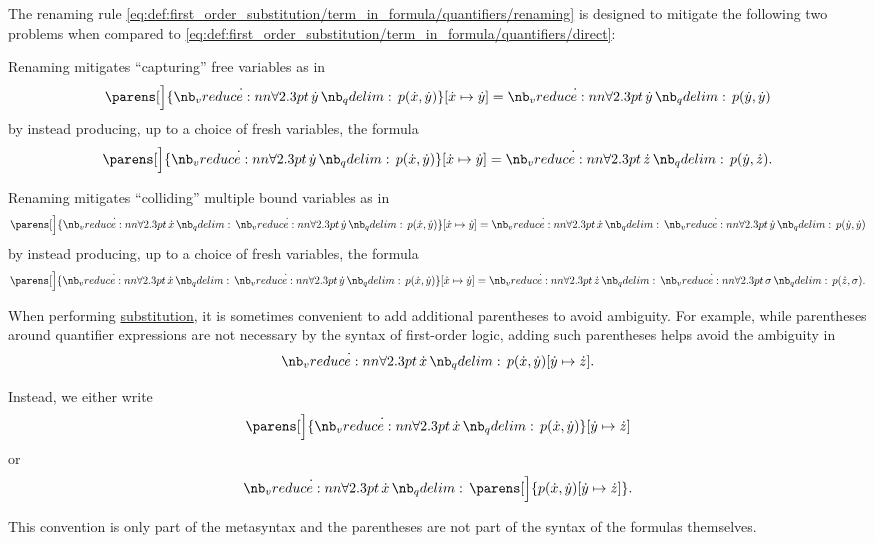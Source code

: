 \begin{remark}\label{rem:first_order_substitution_renaming_justification}
  The renaming rule \eqref{eq:def:first_order_substitution/term_in_formula/quantifiers/renaming} is designed to mitigate the following two problems when compared to \eqref{eq:def:first_order_substitution/term_in_formula/quantifiers/direct}:

  \begin{thmenum}
     Renaming mitigates \enquote{capturing} free variables as in
    \begin{equation*}
      \parens[\Big]{ \qforall \syny p(\synx, \syny) }[\synx \mapsto \syny] = \qforall \syny p(\syny, \syny)
    \end{equation*}
    by instead producing, up to a choice of fresh variables, the formula
    \begin{equation*}
      \parens[\Big]{ \qforall \syny p(\synx, \syny) }[\synx \mapsto \syny] = \qforall \synz p(\syny, \synz).
    \end{equation*}

     Renaming mitigates \enquote{colliding} multiple bound variables as in
    \begin{equation*}
      \parens[\Big]{ \qforall \synx \qforall \syny p(\synx, \syny) }[\synx \mapsto \syny] = \qforall \synx \qforall \syny p(\syny, \syny)
    \end{equation*}
    by instead producing, up to a choice of fresh variables, the formula
    \begin{equation*}
      \parens[\Big]{ \qforall \synx \qforall \syny p(\synx, \syny) }[\synx \mapsto \syny] = \qforall \synz \qforall \sigma p(\synz, \sigma).
    \end{equation*}
  \end{thmenum}
\end{remark}

\begin{remark}\label{rem:first_order_substitution_parentheses}
  When performing \hyperref[def:first_order_substitution]{substitution}, it is sometimes convenient to add additional parentheses to avoid ambiguity. For example, while parentheses around quantifier expressions are not necessary by the syntax of first-order logic, adding such parentheses helps avoid the ambiguity in
  \begin{equation*}
    \qforall \synx p(\synx, \syny) [\syny \mapsto \synz].
  \end{equation*}

  Instead, we either write
  \begin{equation*}
    \parens[\Big]{ \qforall \synx p(\synx, \syny) } [\syny \mapsto \synz]
  \end{equation*}
  or
  \begin{equation*}
    \qforall \synx \parens[\Big]{ p(\synx, \syny)[\syny \mapsto \synz] }.
  \end{equation*}

  This convention is only part of the metasyntax and the parentheses are not part of the syntax of the formulas themselves.
\end{remark}

